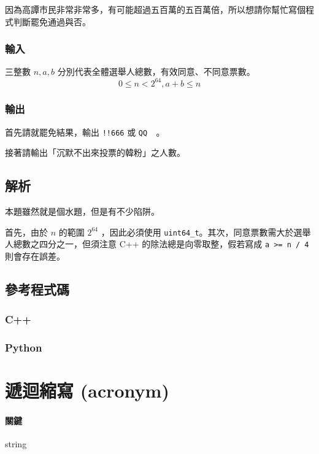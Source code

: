 \documentclass[a4paper,10pt]{article}
\begin{document}
因為高譚市民非常非常多，有可能超過五百萬的五百萬倍，所以想請你幫忙寫個程式判斷罷免通過與否。

\subsubsection{輸入}

三整數 $n, a, b$ 分別代表全體選舉人總數，有效同意、不同意票數。$$0 \leq n < 2^{64}, a + b \leq n$$

\subsubsection{輸出}

首先請就罷免結果，輸出 \texttt{!!666} 或 \texttt{QQ~~}。

接著請輸出「沉默不出來投票的韓粉」之人數。

\subsection{解析}

本題雖然就是個水題，但是有不少陷阱。

首先，由於 $n$ 的範圍 $2^{64}$ ，因此必須使用 \texttt{uint64\_t}。其次，同意票數需大於選舉人總數之四分之一，但須注意 C++ 的除法總是向零取整，假若寫成 \texttt{a >= n / 4} 則會存在誤差。

\subsection{參考程式碼}

\subsubsection{C++}



\subsubsection{Python}



\section{遞迴縮寫 (acronym)}

\paragraph{關鍵} string
\end{document}
